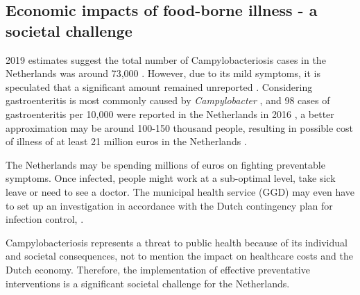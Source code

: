 \subsection*{Economic impacts of food-borne illness - a societal challenge}

2019 estimates suggest the total number of Campylobacteriosis cases in the Netherlands was  around 73,000 \parencite{lagerweij_disease_2020}. However, due to its mild symptoms, it is speculated that a significant amount remained unreported \parencite{koutsoumanis_update_2020}. Considering gastroenteritis is most commonly caused by \textit{Campylobacter} \parencite{fouts_major_2005}, and 98 cases of gastroenteritis per 10,000 were reported in the Netherlands in 2016 \parencite{van_pelt_jaarraport_2016}, a better approximation may be around 100-150 thousand people, resulting in possible cost of illness of at least 21 million euros in the Netherlands \parencite{havelaar_costs_2005}.

The Netherlands may be spending millions of euros on fighting preventable symptoms. Once infected, people might work at a sub-optimal level, take sick leave or need to see a doctor. The municipal health service (GGD) may even have to set up an investigation in accordance with the Dutch contingency plan for infection control, . 

Campylobacteriosis represents a threat to public health because of its individual and societal consequences, not to mention the impact on healthcare costs and the Dutch economy. Therefore, the implementation of effective preventative interventions is a significant societal challenge for the Netherlands.



